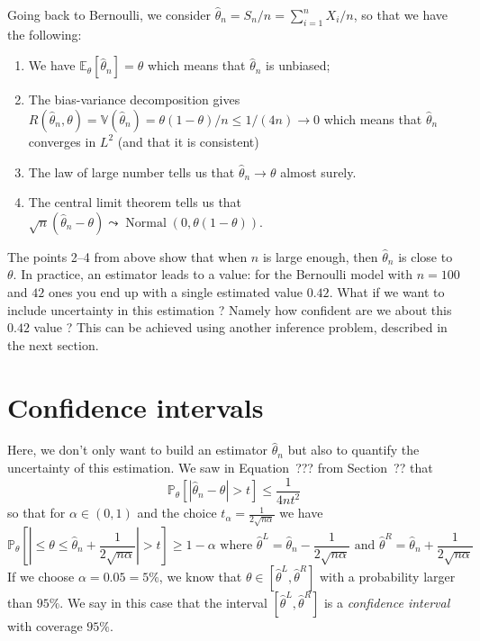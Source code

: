 \documentclass[
	fontsize=11pt, %
	twoside=false, %
	numbers=noenddot, %
]{kaobook}
\DeclareMathOperator{\nor}{Normal}
\renewcommand{\P}{\mathbb P}
\newcommand{\E}{\mathbb E}
\newcommand{\var}{\mathbb V}
\newcommand{\wh}{\widehat}
\newcommand{\goes}{\rightarrow}
\begin{document}
Going back to Bernoulli, we consider $\wh \theta_n = S_n / n = \sum_{i=1}^n X_i / n$, so that we have the following:
\begin{enumerate}
	\item We have $\E_\theta [\wh \theta_n] = \theta$ which means that $\wh \theta_n$ is unbiased;
	\item The bias-variance decomposition gives $R(\wh \theta_n, \theta) = \var(\wh \theta_n) = \theta (1 - \theta) / n \leq 1 / (4n) \rightarrow 0$ which means that $\wh \theta_n$ converges in $L^2$ (and that it is consistent) 
	\item The law of large number tells us that $\wh \theta_n \goes \theta$ almost surely.
	\item The central limit theorem tells us that $\sqrt n (\wh \theta_n - \theta) \leadsto \nor(0, \theta(1 - \theta))$.
\end{enumerate}
The points 2--4 from above show that when $n$ is large enough, then $\wh \theta_n$ is close to $\theta$.
In practice, an estimator leads to a value: for the Bernoulli model with $n=100$ and $42$ ones you end up with a single estimated value $0.42$.
What if we want to include uncertainty in this estimation ?
Namely how confident are we about this $0.42$ value ?
This can be achieved using another inference problem, described in the next section.

\section{Confidence intervals} %
\label{sec:confidence_intervals}

Here, we don't only want to build an estimator $\wh \theta_n$ but also to quantify the uncertainty of this estimation.
We saw in Equation~??? from Section~?? that 
\begin{equation*}
	\P_\theta[ |\wh \theta_n - \theta| > t] \leq \frac{1}{4 n t^2}
\end{equation*}
so that for $\alpha \in (0, 1)$ and the choice $t_\alpha = \frac{1}{2 \sqrt{n \alpha}}$ we have 
\begin{equation*}
	\P_\theta[ | \leq \theta \leq \wh \theta_n + \frac{1}{2 \sqrt{n \alpha}}| > t] \geq 1 - \alpha \text{ where } \wh \theta^L =  \wh \theta_n - \frac{1}{2 \sqrt{n \alpha}} \text{ and } \wh \theta^R =  \wh \theta_n + \frac{1}{2 \sqrt{n \alpha}} 
\end{equation*}
If we choose $\alpha = 0.05 = 5\%$, we know that $\theta \in [\wh \theta^L, \wh \theta^R]$ with a probability larger than $95\%$.
We say in this case that the interval $[\wh \theta^L, \wh \theta^R]$ is a \emph{confidence interval} with coverage $95\%$.
\end{document}
